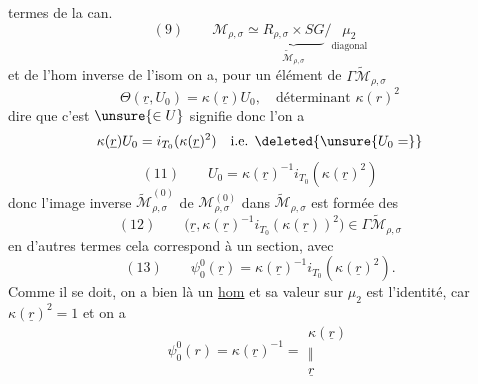 termes de la  can.
\[
(9)\qquad\mathcal M_{\rho,\sigma}\simeq
\underbrace{R_{\rho,\sigma}\times SG}_{\widetilde{\mathcal M}_{\rho,\sigma}}
/\underset{\text{diagonal}}{\mu_2}
\]
et de l'hom
 inverse de l'isom
on a, pour un élément
de $\Gamma\widetilde{\mathcal M}_{\rho,\sigma}$
\[
\Theta(\underline r,U_0)=\kappa(\underline r)U_0,\quad
\text{déterminant }\kappa(r)^2
\]
dire que c'est $\unsure{\in U}$ signifie donc l'on a
\[
\kappa(\underline r)U_0=i_{T_0}(\kappa(\underline r)^2)
\quad\text{i.e. }\deleted{\unsure{U_0=}}
\]
\[
(11)\qquad U_0=\kappa(\underline r)^{-1}i_{T_0}(\kappa(\underline r)^2)
\]
donc l'image inverse $\widetilde{\mathcal M}_{\rho,\sigma}^{(0)}$ de
$\mathcal M_{\rho,\sigma}^{(0)}$ dans $\widetilde{\mathcal M}_{\rho,\sigma}$ est formée des
\[
(12)\qquad
\bigl(\underline r,\kappa(\underline r)^{-1}i_{T_0}(\kappa(\underline r))^2\bigr)
\in\Gamma\widetilde{\mathcal M}_{\rho,\sigma}
\]
en d'autres termes cela correspond à un  section, avec
\[
(13)\qquad\psi^0_0(\underline r)=\kappa(\underline r)^{-1}i_{T_0}(\kappa(\underline r)^2).
\]
Comme il se doit, on a bien là un \uline{hom}
et sa valeur sur $\mu_2$ est l'identité,
car $\kappa(\underline r)^2=1$ et on a
\[
\psi^0_0(r)=\kappa(\underline r)^{-1}=
\begin{gathered}\kappa(\underline r)\\\Vert\\\underline r\end{gathered}
\]

